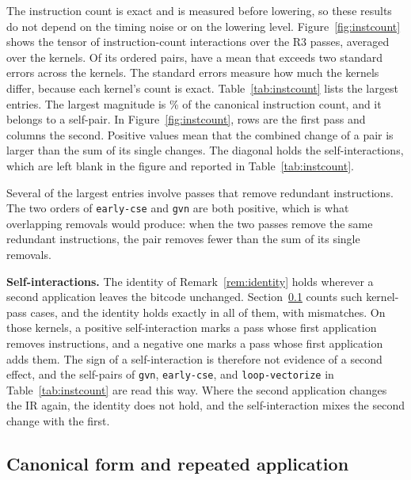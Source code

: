 The instruction count is exact and is measured before lowering, so these results do not depend on the timing noise or on the
lowering level. Figure~\ref{fig:instcount} shows the tensor of instruction-count interactions over the \NumThreePasses{} R3 passes,
averaged over the kernels. Of its \InstInteractionCells{} ordered pairs, \InstInteractionConsistentCells{} have a mean that
exceeds two standard errors across the kernels. The standard errors measure how much the kernels differ, because each
kernel's count is exact. Table~\ref{tab:instcount} lists the largest entries. The largest magnitude is
\InstInteractionMaxAbsPct{}\% of the canonical instruction count, and it belongs to a self-pair. In Figure~\ref{fig:instcount}, rows are the first pass and columns the second. Positive values mean that the combined change of a pair is larger than the sum of its single changes. The diagonal holds the self-interactions, which are left blank in the figure and reported in Table~\ref{tab:instcount}.




Several of the largest entries involve passes that remove redundant instructions. The two orders of \texttt{early-cse} and
\texttt{gvn} are both positive, which is what overlapping removals would produce: when the two passes remove the same redundant
instructions, the pair removes fewer than the sum of its single removals.

\textbf{Self-interactions.} The identity of Remark~\ref{rem:identity} holds wherever a second application leaves the bitcode
unchanged. Section~\ref{sec:results-canonical} counts \InstSelfIdentityCases{} such kernel-pass cases, and the identity holds
exactly in all of them, with \InstSelfIdentityMismatches{} mismatches. On those kernels, a positive self-interaction marks a
pass whose first application removes instructions, and a negative one marks a pass whose first application adds them. The sign
of a self-interaction is therefore not evidence of a second effect, and the self-pairs of \texttt{gvn}, \texttt{early-cse}, and
\texttt{loop-vectorize} in Table~\ref{tab:instcount} are read this way. Where the second application changes the IR again, the
identity does not hold, and the self-interaction mixes the second change with the first.

\subsection{Canonical form and repeated application}
\label{sec:results-canonical}

